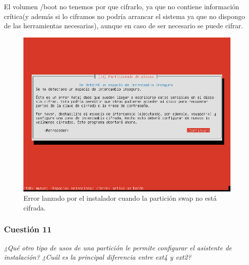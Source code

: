 El volumen /boot no tenemos por que cifrarlo, ya que no contiene información crítica(y además si lo ciframos no podría arrancar el sistema ya que no dispongo de las herramientas necesarias), aunque en caso de ser necesario se puede cifrar. \cite{boot}

\begin{figure}[H]
    \begin{center}
        \includegraphics[scale=0.4]{Imagenes/swap_sin_cifrar}
        \caption{Error lanzado por el instalador cuando la partición swap no está cifrada.}
        \label{fig1}
    \end{center}
\end{figure}

\subsubsection{Cuestión 11}
\textit{¿Qué otro tipo de usos de una partición le permite configurar el asistente de instalación? ¿Cuál es la principal diferencia entre ext4 y ext2?} \newline

